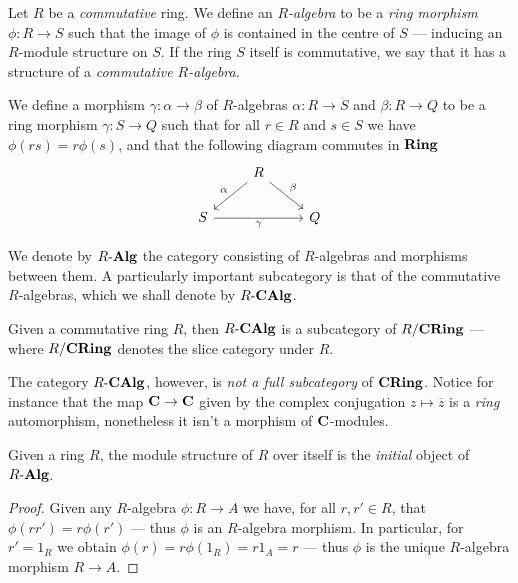 \begin{definition}[\(R\)-algebra]
\label{def:R-algebra}
Let \(R\) be a \emph{commutative} ring. We define an \emph{\(R\)-algebra} to be
a \emph{ring morphism} \(\phi: R \to S\) such that the image of \(\phi\) is
contained in the centre of \(S\) --- inducing an \(R\)-module structure on
\(S\). If the ring \(S\) itself is commutative, we say that it has a structure
of a \emph{commutative \(R\)-algebra}.

We define a morphism \(\gamma: \alpha \to \beta\) of \(R\)-algebras
\(\alpha: R \to S\) and \(\beta: R \to Q\) to be a ring morphism
\(\gamma: S \to Q\) such that for all \(r \in R\) and \(s \in S\) we have
\(\phi(r s) = r \phi(s)\), and that the following diagram commutes in \({\textbf{Ring}}\)
\[
\begin{tikzcd}
&R \ar[ld, "\alpha"'] \ar[rd, "\beta"] & \\
S \ar[rr, "\gamma"']& &Q
\end{tikzcd}
\]

We denote by \({R\text{-}\textbf{Alg}}\) the category consisting of \(R\)-algebras and morphisms
between them. A particularly important subcategory is that of the commutative
\(R\)-algebras, which we shall denote by \({R\text{-}\textbf{CAlg}}\).
\end{definition}

\begin{corollary}
\label{cor:CAlg-subcat-CRing}
Given a commutative ring \(R\), then \({R\text{-}\textbf{CAlg}}\) is a subcategory of
\(R/{\textbf{CRing}}\) --- where \(R/{\textbf{CRing}}\) denotes the slice category under \(R\).
\end{corollary}

\begin{example}
\label{exp:CAlg-not-full-subcat-CRing}
The category \({R\text{-}\textbf{CAlg}}\), however, is \emph{not a full subcategory} of
\({\textbf{CRing}}\). Notice for instance that the map \(\mathbf{C} \to \mathbf{C}\) given by
the complex conjugation \(z \mapsto \overline{z}\) is a \emph{ring}
automorphism, nonetheless it isn't a morphism of \(\mathbf{C}\)-modules.
\end{example}

\begin{proposition}
\label{prop:R-initial-R-alg}
Given a ring \(R\), the module structure of \(R\) over itself is the
\emph{initial} object of \({R\text{-}\textbf{Alg}}\).
\end{proposition}

\begin{proof}
Given any \(R\)-algebra \(\phi: R \to A\) we have, for all \(r, r' \in R\), that
\(\phi(r r') = r \phi(r')\) --- thus \(\phi\) is an \(R\)-algebra morphism. In
particular, for \(r' = 1_R\) we obtain \(\phi(r) = r \phi(1_R) = r 1_A = r\) ---
thus \(\phi\) is the unique \(R\)-algebra morphism \(R \to A\).
\end{proof}

